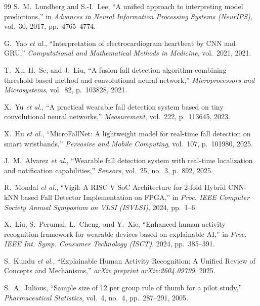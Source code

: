 \begin{thebibliography}{99}
S.~M.~Lundberg and S.-I.~Lee, ``A unified approach to interpreting model predictions,'' in \textit{Advances in Neural Information Processing Systems (NeurIPS)}, vol.~30, 2017, pp.~4765--4774.

G.~Yao \textit{et al.}, ``Interpretation of electrocardiogram heartbeat by CNN and GRU,'' \textit{Computational and Mathematical Methods in Medicine}, vol.~2021, 2021.

T.~Xu, H.~Se, and J.~Liu, ``A fusion fall detection algorithm combining threshold-based method and convolutional neural network,'' \textit{Microprocessors and Microsystems}, vol.~82, p.~103828, 2021.

X.~Yu \textit{et al.}, ``A practical wearable fall detection system based on tiny convolutional neural networks,'' \textit{Measurement}, vol.~222, p.~113645, 2023.

X.~Hu \textit{et al.}, ``MicroFallNet: A lightweight model for real-time fall detection on smart wristbands,'' \textit{Pervasive and Mobile Computing}, vol.~107, p.~101980, 2025.

J.~M.~Alvarez \textit{et al.}, ``Wearable fall detection system with real-time localization and notification capabilities,'' \textit{Sensors}, vol.~25, no.~3, p.~892, 2025.

R.~Mondal \textit{et al.}, ``Vigil: A RISC-V SoC Architecture for 2-fold Hybrid CNN-kNN based Fall Detector Implementation on FPGA,'' in \textit{Proc. IEEE Computer Society Annual Symposium on VLSI (ISVLSI)}, 2024, pp.~1--6.

X.~Liu, S.~Perumal, L.~Cheng, and Y.~Xie, ``Enhanced human activity recognition framework for wearable devices based on explainable AI,'' in \textit{Proc. IEEE Int. Symp. Consumer Technology (ISCT)}, 2024, pp.~385--391.

S.~Kundu \textit{et al.}, ``Explainable Human Activity Recognition: A Unified Review of Concepts and Mechanisms,'' \textit{arXiv preprint arXiv:2604.09799}, 2025.

S.~A.~Julious, ``Sample size of 12 per group rule of thumb for a pilot study,'' \textit{Pharmaceutical Statistics}, vol.~4, no.~4, pp.~287--291, 2005.

\end{thebibliography}

